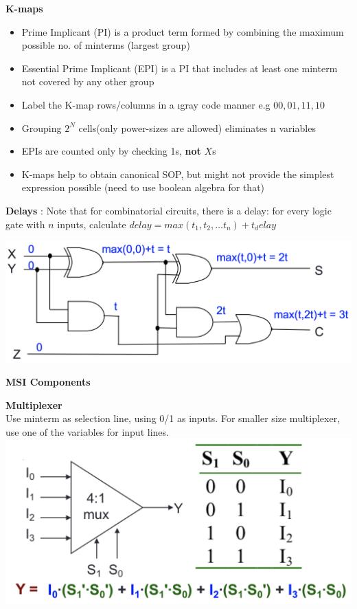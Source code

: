 \documentclass[a4paper]{article} \usepackage[backend=biber, style=numeric, sorting=none]{biblatex}
\begin{document}
\begin{multicols*}{4}
\textbf{K-maps}
\begin{itemize}[leftmargin=*]
\itemsep -0.5em
\item Prime Implicant (PI) is a product term formed by combining the {\i maximum} possible no. of minterms (largest group)
\item Essential Prime Implicant (EPI) is a PI that includes at least one minterm not covered by any other group
\item Label the K-map rows/columns in a {\i gray code} manner e.g $00, 01, 11, 10$
\item Grouping $2^N$ cells(only power-sizes are allowed) eliminates n variables
\item EPIs are counted only by checking 1s, {\bf not} $X$s
\item K-maps help to obtain canonical SOP, but might not provide the simplest expression possible (need to use boolean algebra for that)
\end{itemize}

\textbf {Delays} : Note that for combinatorial circuits, there is a delay: for every logic gate with $n$ inputs, calculate $delay = max(t_1, t_2, \dots t_n) + t_delay$
\begin{center}
\includegraphics[scale=0.18]{circuit_delay}
\end{center}

\columnbreak
{\small\textbf{MSI Components}}

\begin{multicols*}{2}
\textbf{{Multiplexer}}
\\ Use minterm as selection line, using 0/1 as inputs. For smaller size multiplexer, use one of the variables for input lines.
\vfill\null
\columnbreak
{\centering \includegraphics[scale=0.16]{multiplexer}}
\end{multicols*}


\end{multicols*}
\end{document}
